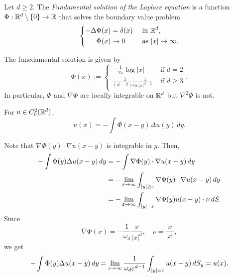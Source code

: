 \documentclass{../note}
\begin{document}
\begin{prb}
Let $d\ge2$.
The \emph{Fundamental solution of the Laplace equation} is a function $\Phi:\mathbb{R}^d\setminus\{0\}\to\mathbb{R}$ that solves the boundary value problem
\[\left\{\begin{alignedat}{2}
-\Delta\Phi(x)&=\delta(x) &\quad&\text{ in }\mathbb{R}^d,\\
\Phi(x)&\to0 &&\text{ as }|x|\to\infty.
\end{alignedat}\right.\]
\begin{parts}
\item The funcdamental solution is given by
\[\Phi(x):=\begin{cases}-\frac1{2\pi}\log|x|&\text{ if }d=2\\\frac1{(d-2)\omega_d}\frac1{|x|^{d-2}}&\text{ if }d\ge3\end{cases}.\]
In particular, $\Phi$ and $\nabla\Phi$ are locally integrable on $\mathbb{R}^d$ but $\nabla^2\Phi$ is not.
\item For $u\in C_0^2(\mathbb{R}^d)$,
\[u(x)=-\int\Phi(x-y)\Delta u(y)\,dy.\]
\end{parts}
\end{prb}
\begin{pf}
Note that $\nabla\Phi(y)\cdot\nabla u(x-y)$ is integrable in $y$.
Then,
\begin{align*}
-\int\Phi(y)\Delta u(x-y)\,dy
&=-\int\nabla\Phi(y)\cdot\nabla u(x-y)\,dy\\
&=-\lim_{\varepsilon\to\infty}\int_{|y|\ge\varepsilon}\nabla\Phi(y)\cdot\nabla u(x-y)\,dy\\
&=-\lim_{\varepsilon\to\infty}\int_{|y|=\varepsilon}\nabla\Phi(y)u(x-y)\cdot\nu\,dS.
\end{align*}
Since
\[\nabla\Phi(x)=-\frac1{\omega_d}\frac x{|x|^d},\quad\nu=\frac x{|x|},\]
we get
\[-\int\Phi(y)\Delta u(x-y)\,dy=\lim_{\varepsilon\to\infty}\frac1{\omega_d\varepsilon^{d-1}}\int_{|y|=\varepsilon}u(x-y)\,dS_y=u(x).\]

\end{pf}
\end{document}
